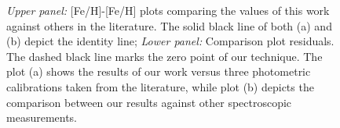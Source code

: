 \documentclass[referee]{aa}
\begin{document}
\begin{figure}[]
\begin{center}
\end{center}
\caption{\textit{Upper panel:} [Fe/H]-[Fe/H] plots comparing the values of this work against others in the literature. The solid black line of both (a) and (b) depict the identity line; \textit{Lower panel:} Comparison plot residuals. The dashed black line marks the zero point of our technique. The plot (a) shows the results of our work versus three photometric calibrations taken from the literature, while plot (b) depicts the comparison between our results against other spectroscopic measurements.}
\label{fig:compfeh}
\end{figure}
\end{document}

